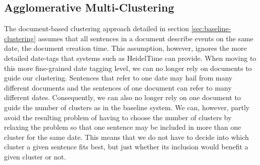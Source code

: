 \documentclass[a4paper,BCOR=10mm]{report}
\numberwithin{lemma}{chapter}
\numberwithin{definition}{chapter}
\begin{document}
%
%

\subsection{Agglomerative Multi-Clustering}

The document-based clustering approach detailed in section \ref{sec:baseline-clustering} assumes that all sentences in a document describe events on the same date, the document creation time. This assumption, however, ignores the more detailed date-tags that systems such as HeidelTime \citep{heideltime} can provide.
When moving to this more fine-grained date tagging level, we can no longer rely on documents to guide our clustering. Sentences that refer to one date may hail from many different documents and the sentences of one document can refer to many different dates.
Consequently, we can also no longer rely on one document to guide the number of clusters as in the baseline system. We can, however, partly avoid the resulting problem of having to choose the number of clusters by relaxing the problem so that one sentence may be included in more than one cluster for the same date.
This means that we do not have to decide into which cluster a given sentence fits best, but just whether its inclusion would benefit a given cluster or not.
\end{document}
